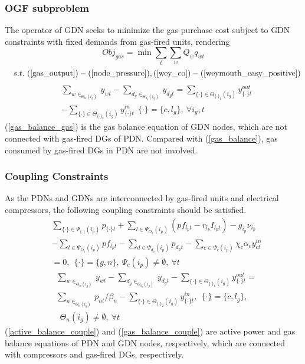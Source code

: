 \documentclass[journal]{IEEEtran}
\begin{document}
\subsubsection{OGF subproblem}
The operator of GDN seeks to minimize the gas purchase cost subject to GDN constraints with fixed demands from gas-fired units, rendering
\begin{equation}\label{Obj_OGF}
Obj_{gas}=\min\sum_{t}\sum_{w}Q_wq_{wt}
\end{equation}
\begin{equation*}
~~~s.t.~(\ref{gas_output})-(\ref{node_pressure}), (\ref{wey_co})-(\ref{weymouth_easy_positive})
\end{equation*}
\begin{equation}
\label{gas_balance_gas}
\begin{split}
&\sum_{w\in_{\Theta_w(i_g)}}y_{wt}-\sum_{d_g\in_{\Theta_{d_g}(i_g)}}y_{d_gt}=\sum_{\{\cdot\}\in\Theta_{\{\cdot\}_{1}}(i_g)}y^{out}_{\{\cdot\}t}\\
&-\sum_{\{\cdot\}\in\Theta_{\{\cdot\}_{2}}(i_g)}y^{in}_{\{\cdot\}t}~~\{\cdot\}=\{c,l_g\},~\forall i_g,t
\end{split}
\end{equation}
(\ref{gas_balance_gas}) is the gas balance equation of GDN nodes, which are not connected with gas-fired DGs of PDN. Compared with (\ref{gas_balance}), gas consumed by gas-fired DGs in PDN are not involved.

\subsubsection{Coupling Constraints}
As the PDNs and GDNs are interconnected by gas-fired units and electrical compressors, the following coupling constraints should be satisfied.
\begin{equation}
\label{active_balance_couple}
\begin{split}
&\sum_{\{\cdot\}\in \Psi_{\{\cdot\}}(i_p)}p_{\{\cdot\}t}+\sum_{l\in \Psi_{O_2}(i_p)}(pf_{l_pt}-r_{l_p}I_{l_pt})-g_{i_p}\nu_{i_p}\\
&-\sum_{l\in\Psi_{O_1}(i_p)}pf_{l_pt}-\sum_{d\in \Psi_{d_p}(i_p)}p_{d_pt}-\sum_{c\in\Psi_c(i_p)}\chi_c\alpha_cy_{ct}^{in}\\
&=0,~~\{\cdot\}=\{g,n\},~\Psi_c(i_p)\neq\emptyset,~\forall t
\end{split}
\end{equation}
\begin{equation}
\label{gas_balance_couple}
\begin{split}
&\sum_{w\in_{\Theta_w(i_g)}}y_{wt}-\sum_{d_g\in_{\Theta_{d_g}(i_g)}}y_{d_gt}-\sum_{\{\cdot\}\in\Theta_{\{\cdot\}_{1}}(i_g)}y^{out}_{\{\cdot\}t}=\\
&\sum_{n\in_{\Theta_n(i_g)}}p_{nt}/\beta_n-\sum_{\{\cdot\}\in\Theta_{\{\cdot\}_{2}}(i_g)}y^{in}_{\{\cdot\}t},~~\{\cdot\}=\{c,l_g\},\\
&~~\Theta_n(i_g)\neq\emptyset,~\forall t
\end{split}
\end{equation}
(\ref{active_balance_couple}) and (\ref{gas_balance_couple}) are active power and gas balance equations of PDN and GDN nodes, respectively, which are connected with compressors and gas-fired DGs, respectively.
\end{document}
